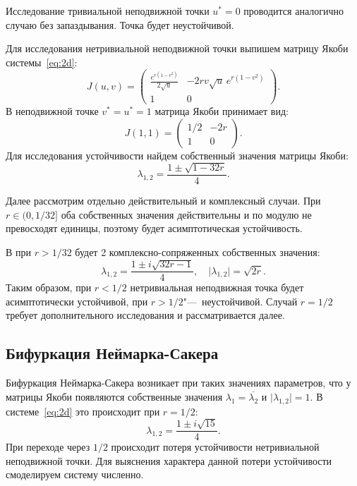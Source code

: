 \documentclass[12pt, a4paper]{article} %
\begin{document}
Исследование тривиальной неподвижной точки $u^*=0$ проводится аналогично случаю без запаздывания. 
Точка будет неустойчивой.

Для исследования нетривиальной неподвижной точки выпишем матрицу Якоби системы~\eqref{eq:2d}:
\begin{equation}\label{Jac}
    J(u, v) = 
    \begin{pmatrix}
        \frac{e^{r(1-v^2)}}{2\sqrt{u}} & -2rv\sqrt{u}\,e^{r(1-v^2)} \\
        1 & 0
    \end{pmatrix} 
.\end{equation} 
В неподвижной точке $v^{*}=u^{*} = 1$ матрица Якоби принимает вид:
\begin{equation}\label{Jac_st}
    J(1, 1) = 
    \begin{pmatrix}
        1\!/2 & -2r \\
        1 & 0
    \end{pmatrix} 
.\end{equation} 
Для исследования устойчивости найдем собственный значения матрицы Якоби:
\begin{equation}\label{Jac_eig}
    \lambda_{1,2} = \frac{1 \pm \sqrt{1 - 32r}}{4}
.\end{equation} 

Далее рассмотрим отдельно действительный и комплексный случаи.
При $r \in (0, 1\!/32]$ оба собственных значения действительны и по модулю не превосходят единицы, поэтому будет асимптотическая устойчивость.

В при  $r > 1\!/32$ будет 2 комплексно-сопряженных собственных значения:
 \begin{equation}\label{eq:eig_compl}
     \lambda_{1,2} = \frac{1 \pm i\sqrt{32r - 1}}{4}, \quad 
     \lvert \lambda_{1,2} \rvert = \sqrt{2r}
.\end{equation} 
Таким образом, при $r < 1\!/2$ нетривиальная неподвижная точка будет асимптотически устойчивой, 
при $r > 1\!/2$"---~неустойчивой. 
Случай $r=1\!/2$ требует дополнительного исследования и рассматривается далее.

\subsection{Бифуркация Неймарка-Сакера}

Бифуркация Неймарка-Сакера возникает при таких значениях параметров,
что у матрицы Якоби появляются собственные значения 
$\lambda_1 = \overline{\lambda_2}$ и $\lvert \lambda_{1,2} \rvert = 1$.
В системе~\eqref{eq:2d} это происходит при $r=1\!/2$:
 \begin{equation}\label{eq:bifurc_eig}
     \lambda_{1,2} = \frac{1 \pm i\sqrt{15}}{4}
.\end{equation} 
При переходе через $1\!/2$ происходит потеря устойчивости нетривиальной неподвижной точки.
Для выяснения характера данной потери устойчивости смоделируем систему численно.
\end{document}

